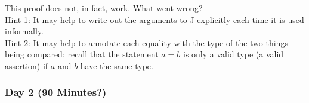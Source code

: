 \documentclass{article}
\begin{document}
\begin{itemize}
\begin{itemize}
        This proof does not, in fact, work.  What went wrong? \\
        Hint 1: It may help to write out the arguments to J explicitly each time it is used informally. \\
        Hint 2: It may help to annotate each equality with the type of the two things being compared; recall that the statement $a = b$ is only a valid type (a valid assertion) if $a$ and $b$ have the same type.
    \end{itemize}
\end{itemize}

\subsubsection*{Day 2 (90 Minutes?)}
\end{document}
